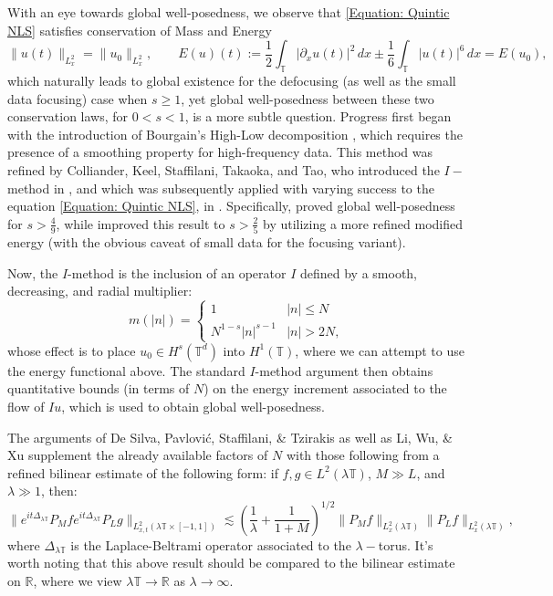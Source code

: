 \documentclass[12pt, letterpaper]{amsart}
\begin{document}
With an eye towards global well-posedness, we observe that \eqref{Equation: Quintic NLS} satisfies conservation of Mass and Energy
\begin{equation*}
\|u(t)\|_{L^2_x} = \|u_0\|_{L^2_{x}},\qquad E(u)(t) := \frac{1}{2}\int_{\mathbb{T}}|\partial_x u(t)|^2\,dx\pm \frac{1}{6}\int_{\mathbb{T}}|u(t)|^{6}\,dx = E(u_0),
\end{equation*}
which naturally leads to global existence for the defocusing (as well as the small data focusing) case when $s \geq 1$, yet global well-posedness between these two conservation laws, for $0 < s < 1$, is a more subtle question. Progress first began with the introduction of Bourgain's High-Low decomposition \cite{bourgain1998refinements}, which requires the presence of a smoothing property for high-frequency data. This method was refined by Colliander, Keel, Staffilani, Takaoka, and Tao, who introduced the $I-$method in \cite{colliander2001global, MR1906069, colliander2003sharp}, and which was subsequently applied with varying success to the equation \eqref{Equation: Quintic NLS}, in \cite{de2007global, li2011global}. Specifically, \cite{de2007global} proved global well-posedness for $s > \frac49$, while \cite{li2011global} improved this result to $s > \frac25$ by utilizing a more refined modified energy (with the obvious caveat of small data for the focusing variant).

Now, the $I$-method is the inclusion of an operator $I$ defined by a smooth, decreasing, and radial multiplier:
\begin{equation}\label{Definition: m definition}
m(|n|) = 
\begin{cases}
    1 & |n|\leq N\\
    N^{1-s}|n|^{s-1} & |n|> 2N,
\end{cases}
\end{equation}
whose effect is to place $u_0\in H^s(\mathbb{T}^d)$ into $H^1(\mathbb{T})$, where we can attempt to use the energy functional above. The standard $I$-method argument then obtains quantitative bounds (in terms of $N$) on the energy increment associated to the flow of $Iu$, which is used to obtain global well-posedness. 

The arguments of {De Silva}, Pavlovi{\'c}, Staffilani, \& Tzirakis \cite{de2007global} as well as Li, Wu, \& Xu \cite{li2011global} supplement the already available factors of $N$ with those following from a refined bilinear estimate of the following form: if $f,g\in L^2(\lambda\mathbb{T})$, $M\gg L$, and $\lambda\gg 1$, then:
\begin{equation}\label{Equation: Base Introduction Bilinear}
\big\|e^{it\Delta_{\lambda\mathbb{T}}}P_Mfe^{it\Delta_{\lambda\mathbb{T}}}P_Lg\big\|_{L^2_{x,t}(\lambda\mathbb{T}\times [-1,1])}\lesssim \left(\frac{1}{\lambda}+\frac{1}{1+M}\right)^{1/2}\|P_Mf\|_{L^2_x(\lambda\mathbb{T})}\|P_Lf\|_{L^2_x(\lambda\mathbb{T})},
\end{equation}
where $\Delta_{\lambda\mathbb{T}}$ is the Laplace-Beltrami operator associated to the $\lambda-$torus. It's worth noting that this above result should be compared to the bilinear estimate on $\mathbb{R}$, where we view $\lambda\mathbb{T}\to\mathbb{R}$ as $\lambda\to\infty$.
\end{document}
